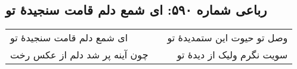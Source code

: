 \begin{center}
\section*{رباعی شماره ۵۹۰: ای شمع دلم قامت سنجیدهٔ تو}
\label{sec:sh590}
\begin{longtable}{l p{0.5cm} r}
ای شمع دلم قامت سنجیدهٔ تو
&&
وصل تو حیوت این ستمدیدهٔ تو
\\
چون آینه پر شد دلم از عکس رخت
&&
سویت نگرم ولیک از دیدهٔ تو
\\
\end{longtable}
\end{center}
